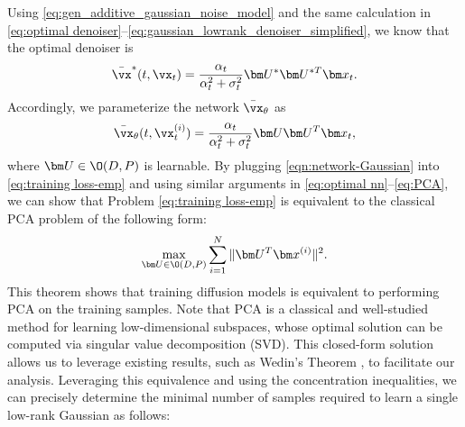 \documentclass[../../book-main.tex]{subfiles}
\begin{document}
Using \eqref{eq:gen_additive_gaussian_noise_model} and the same calculation in \eqref{eq:optimal denoiser}--\eqref{eq:gaussian_lowrank_denoiser_simplified}, we know that the optimal denoiser is  
\begin{align}
    \bar{\vx}^{\ast}(t, \vx_{t}) = \frac{\alpha_t}{\alpha_t^2 + \sigma_t^2}\bm U^*\bm U^{*T}\bm x_t.
\end{align}
Accordingly, we parameterize the network $\bar{\vx}_{\theta}$ as
\begin{align}\label{eqn:network-Gaussian}
    \bar{\vx}_{\theta}(t, \vx^{(i)}_t) = \frac{\alpha_t}{\alpha_t^2 + \sigma_t^2}\bm U\bm U^T\bm x_t,
\end{align}
where $\bm U \in \O(D, P)$ is learnable. By plugging \eqref{eqn:network-Gaussian} into \eqref{eq:training loss-emp} and using similar arguments in \eqref{eq:optimal nn}--\eqref{eq:PCA}, we can show that Problem \eqref{eq:training loss-emp} is equivalent to the classical PCA problem of the following form: 
    \begin{align}\label{eq:em loss}
        \max_{\bm U \in \O(D, P)} \sum_{i=1}^N \|\bm U^T \bm x^{(i)}\|^2. 
    \end{align}
This theorem shows that training diffusion models is equivalent to performing PCA on the training samples. Note that PCA is a classical and well-studied method for learning low-dimensional subspaces, whose optimal solution can be computed via singular value decomposition (SVD). This closed-form solution allows us to leverage existing results, such as Wedin's Theorem \cite{wedin1972perturbation}, to facilitate our analysis. Leveraging this equivalence and using the concentration inequalities, we can precisely determine the minimal number of samples required to learn a single low-rank Gaussian as follows: 
\end{document}
